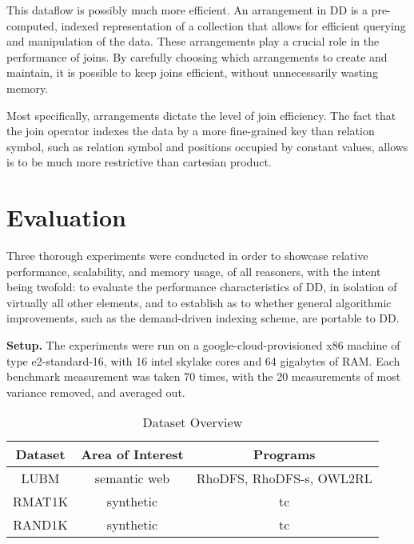 \documentclass[sigconf,screen,review=false,natbib]{acmart}
\theoremstyle{definition}
\begin{document}
This dataflow is possibly much more efficient. An arrangement in DD is a pre-computed, indexed representation of a collection that allows for efficient
querying and manipulation of the data. These arrangements play a crucial role in the performance of joins. By carefully choosing which arrangements to
create and maintain, it is possible to keep joins efficient, without unnecessarily wasting memory.

Most specifically, arrangements dictate the level of join efficiency. The fact that the join operator indexes the data by a more fine-grained key than relation
symbol, such as relation symbol and positions occupied by constant values, allows is to be much more restrictive than cartesian product.
\section{Evaluation}
Three thorough experiments were conducted in order to showcase relative performance, scalability, and memory usage, of all reasoners, with the intent being twofold:
to evaluate the performance characteristics of DD, in isolation of virtually all other elements, and to establish as to whether general algorithmic
improvements, such as the demand-driven indexing scheme, are portable to DD.

\textbf{Setup.} The experiments were run on a google-cloud-provisioned x86 machine of type e2-standard-16, with 16 intel skylake cores and 64 gigabytes of RAM. Each
benchmark measurement was taken 70 times, with the 20 measurements of most variance removed, and averaged out.
\begin{table}
	\caption{Dataset Overview}
	\begin{tabular}{|c|c|c|}
		\hline
		Dataset & Area of Interest & Programs                 \\
		\hline
		LUBM    & semantic web     & RhoDFS, RhoDFS-s, OWL2RL \\
		\hline
		RMAT1K  & synthetic        & tc                       \\
		\hline
		RAND1K  & synthetic        & tc                       \\
		\hline
	\end{tabular}
	\label{tab:datasets}
\end{table}
\end{document}
